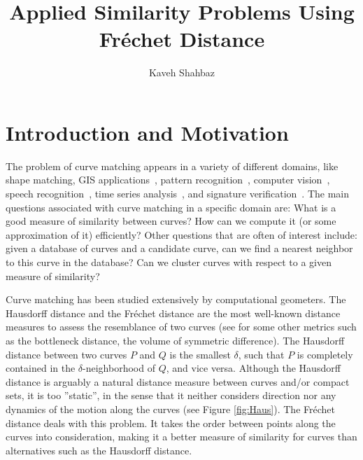 \documentclass[12pt]{dalthesis}
\newcommand{\Frechet}{Fr\'echet }
\begin{document}
\title{
Applied Similarity Problems Using \Frechet Distance 
        \\}
\author{Kaveh Shahbaz}
 

\frontmatter









\pagestyle{fancy}
\fancyhf{}
\renewcommand{\headrulewidth}{0pt}
\fancyhead[LE,RO]{\thepage}
\renewcommand{\chaptermark}[1]{\markboth{\chaptername \ \thechapter.\ #1}{}}
\lhead{\nouppercase{\leftmark}}





\clearpage{}\chapter {Introduction and Motivation}
\setcounter{page}{1}
\label{ch:Background}





The problem of curve matching appears in a variety of different domains, like 
shape matching, GIS applications~\cite{AltERW03a, Buchin10, Appx-MM}, 
pattern recognition~\cite{FDRevisited,JiangXZ08}, 
computer vision~\cite{AltBook2009}, speech recognition~\cite{FDSpeech},  
time series analysis~\cite{FDTime},  
and signature verification~\cite{FDHandwriting,SriraghavendraKB07}.  The main questions
associated with curve matching in a specific domain
are: What is a good measure of similarity between curves? How can we compute it (or some approximation
of it) efficiently? Other questions that are often
of interest include: given a database of curves and a candidate
curve, can we find a nearest neighbor to this curve
in the database? Can we cluster curves with respect to
a given measure of similarity?

Curve matching has been studied extensively by computational 
geometers. 
The Hausdorff distance and the \Frechet distance are the most well-known distance measures 
to assess the resemblance of two curves
(see \cite{SomeOtherMetrics} for some other metrics such as 
the bottleneck distance, the volume of symmetric difference).
The Hausdorff distance between two curves $P$ and $Q$ is the smallest $\delta$,
such that $P$ is completely contained in the $\delta$-neighborhood of $Q$, and vice
versa. 
Although the Hausdorff distance is arguably a  natural distance
measure between curves and/or compact sets, it is too ”static”,
in the sense that it neither considers 
direction nor any dynamics of the motion along the curves
(see Figure \ref{fig:Haus}). The \Frechet distance deals with
this problem. It takes the order between points along 
the curves into consideration, making it a better 
measure of similarity for curves than alternatives 
such as the Hausdorff distance. 
\end{document}
